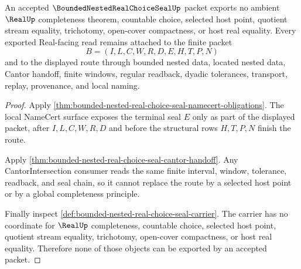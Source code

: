 \begin{theorem}
\label{thm:bounded-nested-real-choice-seal-nonescape}
An accepted $\BoundedNestedRealChoiceSealUp$ packet exports no ambient $\RealUp$ completeness theorem, countable choice, selected host point, quotient stream equality, trichotomy, open-cover compactness, or host real equality. Every exported Real-facing read remains attached to the finite packet
$$
B=(I,L,C,W,R,D,E,H,T,P,N)
$$
and to the displayed route through bounded nested data, located nested data, Cantor handoff, finite windows, regular readback, dyadic tolerances, transport, replay, provenance, and local naming.
\end{theorem}
\begin{proof}
Apply \autoref{thm:bounded-nested-real-choice-seal-namecert-obligations}. The local NameCert surface exposes the terminal seal $E$ only as part of the displayed packet, after $I,L,C,W,R,D$ and before the structural rows $H,T,P,N$ finish the route.

Apply \autoref{thm:bounded-nested-real-choice-seal-cantor-handoff}. Any CantorIntersection consumer reads the same finite interval, window, tolerance, readback, and seal chain, so it cannot replace the route by a selected host point or by a global completeness principle.

Finally inspect \autoref{def:bounded-nested-real-choice-seal-carrier}. The carrier has no coordinate for $\RealUp$ completeness, countable choice, selected host point, quotient stream equality, trichotomy, open-cover compactness, or host real equality. Therefore none of those objects can be exported by an accepted packet.
\end{proof}


